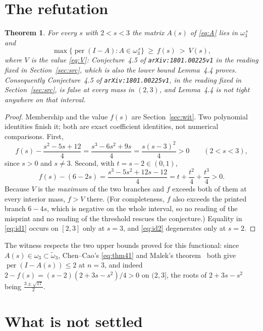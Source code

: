 \documentclass[11pt]{amsart}
\newtheorem{theorem}{Theorem}
\theoremstyle{remark}
\DeclareMathOperator{\per}{per}
\newcommand{\ws}{\omega}
\newcommand{\wt}{\tilde{\omega}}
\begin{document}
\section{The refutation}\label{sec:thm}

\begin{theorem}\label{thm:main}
For every $s$ with $2<s<3$ the matrix $A(s)$ of \eqref{eq:A} lies in
$\ws_3^{\,s}$ and
\[
 \max\{\per(I-A):A\in\ws_3^{\,s}\}\ \ge\ f(s)\ >\ V(s),
\]
where $V$ is the value \eqref{eq:V}: Conjecture~4.5 of \texttt{arXiv:1801.00225v1} in
the reading fixed in Section~\ref{sec:src}, which is also the lower bound Lemma~4.4
proves.
Consequently Conjecture~4.5 of \texttt{arXiv:1801.00225v1}, in the reading fixed in
Section~\ref{sec:src}, is false at every mass in $(2,3)$, and Lemma~4.4 is not tight
anywhere on that interval.
\end{theorem}

\begin{proof}
Membership and the value $f(s)$ are Section~\ref{sec:wit}. Two polynomial identities
finish it; both are exact coefficient identities, not numerical comparisons. First,
\begin{equation}\label{eq:id1}
 f(s)-\frac{s^{2}-5s+12}{4}=\frac{s^{3}-6s^{2}+9s}{4}=\frac{s(s-3)^{2}}{4}>0
 \qquad(2<s<3),
\end{equation}
since $s>0$ and $s\ne3$. Second, with $t=s-2\in(0,1)$,
\begin{equation}\label{eq:id2}
 f(s)-(6-2s)=\frac{s^{3}-5s^{2}+12s-12}{4}=t+\frac{t^{2}}4+\frac{t^{3}}4>0 .
\end{equation}
Because $V$ is the \emph{maximum} of the two branches and $f$ exceeds both of them at
every interior mass, $f>V$ there. (For completeness, $f$ also exceeds the printed
branch $6-4s$, which is negative on the whole interval, so no reading of the misprint
and no reading of the threshold rescues the conjecture.) Equality in \eqref{eq:id1}
occurs on $[2,3]$ only at $s=3$, and \eqref{eq:id2} degenerates only at $s=2$.
\end{proof}

The witness respects the two upper bounds proved for this functional: since
$A(s)\in\ws_3\subset\wt_3$, Chen--Cao's \eqref{eq:thm41} and Malek's
theorem~\cite{malek} both give $\per(I-A(s))\le2$ at $n=3$, and indeed
$2-f(s)=(s-2)(2+3s-s^{2})/4>0$ on $(2,3]$, the roots of $2+3s-s^{2}$ being
$\tfrac{3\pm\sqrt{17}}2$.

\section{What is not settled}\label{sec:open}
\end{document}
